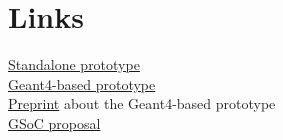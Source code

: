\documentclass[a4paper, 12pt]{article} %
\begin{document}
 \section*{ Links }
 
  \href{https://bitbucket.org/sd57/pedigree-git}{Standalone prototype}\\
  \href{https://bitbucket.org/sd57/geant4/branch/pedigree}{Geant4-based prototype}\\
  \href{https://sd57.github.io/g4dprng/gsocPreprint.html}{Preprint} about the Geant4-based prototype\\
  \href{https://sd57.github.io/g4dprng/gsoc-proposal-Savin.html}{GSoC proposal}\\
  
%  
%  
 
\end{document}

